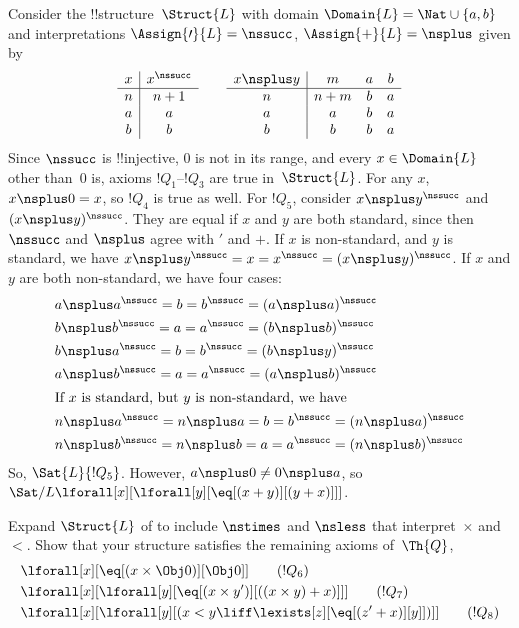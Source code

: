 \documentclass[../../../include/open-logic-section]{subfiles}
\begin{document}
\begin{ex}
 Consider the !!{structure}~$\Struct{L}$ with
domain $\Domain{L} = \Nat \cup \{a, b\}$ and interpretations
$\Assign{\prime}{L} = \nssucc$, $\Assign{+}{L} = \nsplus$ given by
\[
\begin{array}{c|c}
  x & x^\nssucc \\
  \hline
  n & n+1 \\
  a & a\\
  b & b
\end{array}
\qquad
\begin{array}{c|ccc}
  x \nsplus y & m & a & b\\
  \hline
  n & n+m & b & a\\
  a & a & b & a\\
  b & b & b & a
\end{array}
\]
Since $\nssucc$ is !!{injective}, $0$ is not in its range, and every
$x \in \Domain{L}$ other than~$0$ is, axioms $!Q_1$--$!Q_3$ are true
in~$\Struct{L}$. For any $x$, $x \nsplus 0 = x$, so $!Q_4$ is true as
well.  For $!Q_5$, consider $x \nsplus y^\nssucc$ and $(x \nsplus
y)^\nssucc$. They are equal if $x$ and $y$ are both standard, since
then $\nssucc$ and $\nsplus$ agree with $\prime$ and $+$. If $x$ is
non-standard, and $y$ is standard, we have $x \nsplus y^\nssucc = x =
x^\nssucc = (x \nsplus y)^\nssucc$. If $x$ and $y$ are both
non-standard, we have four cases:
\begin{align*}
&  a \nsplus a^\nssucc  = b = b^\nssucc = (a \nsplus a)^\nssucc\\
&  b \nsplus b^\nssucc  = a = a^\nssucc = (b \nsplus b)^\nssucc\\
&  b \nsplus a^\nssucc  = b = b^\nssucc = (b \nsplus y)^\nssucc\\
&  a \nsplus b^\nssucc  = a = a^\nssucc = (a \nsplus b)^\nssucc\\
\intertext{If $x$ is standard, but $y$ is non-standard, we have}
&  n \nsplus a^\nssucc  = n \nsplus a = b = b^\nssucc = (n \nsplus a)^\nssucc\\
&  n \nsplus b^\nssucc  = n \nsplus b = a = a^\nssucc = (n \nsplus b)^\nssucc
\end{align*}
So, $\Sat{L}{!Q_5}$. However, $a \nsplus 0 \neq 0 \nsplus a$, so
$\Sat/{L}{\lforall[x][\lforall[y][\eq[(x+y)][(y+x)]]]}$.
\end{ex}

\begin{prob}
Expand $\Struct{L}$ of  to
include $\nstimes$ and $\nsless$ that interpret~$\times$ and $<$. Show
that your structure satisfies the remaining axioms of~$\Th{Q}$,
\begin{align*}
& \lforall[x][\eq[(x \times \Obj 0)][\Obj 0]] \tag{$!Q_6$}\\ &
  \lforall[x][\lforall[y][\eq[(x \times y')][((x \times y) + x)]]]
  \tag{$!Q_7$}\\ & \lforall[x][\lforall[y][(x < y \liff \lexists[z][\eq[(z'+x)][y]])]] \tag{$!Q_8$}
\end{align*}
\end{prob}
\end{document}
